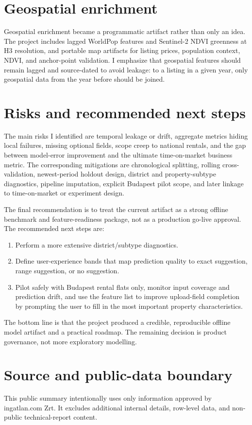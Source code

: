 \documentclass[12pt,a4paper]{article}
\begin{document}
\section{Geospatial enrichment}

Geospatial enrichment became a programmatic artifact rather than only an idea. The project includes lagged WorldPop features and Sentinel-2 NDVI greenness at H3 resolution, and portable map artifacts for listing prices, population context, NDVI, and anchor-point validation. I emphasize that geospatial features should remain lagged and source-dated to avoid leakage: to a listing in a given year, only geospatial data from the year before should be joined.

\section{Risks and recommended next steps}

The main risks I identified are temporal leakage or drift, aggregate metrics hiding local failures, missing optional fields, scope creep to national rentals, and the gap between model-error improvement and the ultimate time-on-market business metric. The corresponding mitigations are chronological splitting, rolling cross-validation, newest-period holdout design, district and property-subtype diagnostics, pipeline imputation, explicit Budapest pilot scope, and later linkage to time-on-market or experiment design.

The final recommendation is to treat the current artifact as a strong offline benchmark and feature-readiness package, not as a production go-live approval. The recommended next steps are:

\begin{enumerate}
  \item Perform a more extensive district/subtype diagnostics.
  \item Define user-experience bands that map prediction quality to exact suggestion, range suggestion, or no suggestion.
  \item Pilot safely with Budapest rental flats only, monitor input coverage and prediction drift, and use the feature list to improve upload-field completion by prompting the user to fill in the most important property characteristics.
\end{enumerate}

The bottom line is that the project produced a credible, reproducible offline model artifact and a practical roadmap. The remaining decision is product governance, not more exploratory modelling.

\section{Source and public-data boundary}

This public summary intentionally uses only information approved by ingatlan.com Zrt. It excludes additional internal details, row-level data, and non-public technical-report content.
\end{document}
